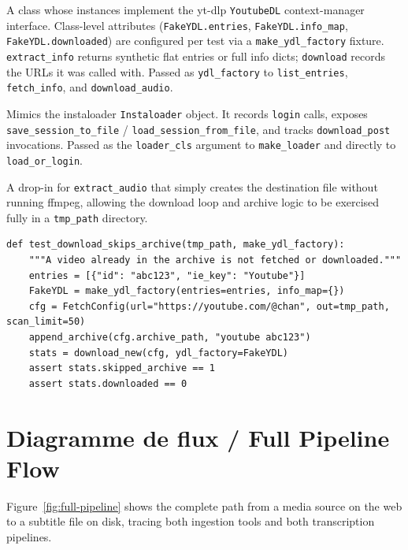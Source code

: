 \documentclass[11pt,a4paper]{report}
\newcommand{\code}[1]{\texttt{\small #1}}
\begin{document}
\begin{description}[leftmargin=2em,style=nextline]
  \item[\code{FakeYDL}] A class whose instances implement the yt-dlp
        \code{YoutubeDL} context-manager interface.  Class-level attributes
        (\code{FakeYDL.entries}, \code{FakeYDL.info\_map}, \code{FakeYDL.downloaded})
        are configured per test via a \code{make\_ydl\_factory} fixture.
        \code{extract\_info} returns synthetic flat entries or full info dicts;
        \code{download} records the URLs it was called with.  Passed as
        \code{ydl\_factory} to \code{list\_entries}, \code{fetch\_info}, and
        \code{download\_audio}.
  \item[\code{FakeLoader}] Mimics the instaloader \code{Instaloader} object.
        It records \code{login} calls, exposes \code{save\_session\_to\_file} /
        \code{load\_session\_from\_file}, and tracks \code{download\_post}
        invocations.  Passed as the \code{loader\_cls} argument to
        \code{make\_loader} and directly to \code{load\_or\_login}.
  \item[\code{fake\_extract}] A drop-in for \code{extract\_audio} that simply
        creates the destination file without running ffmpeg, allowing the download
        loop and archive logic to be exercised fully in a \code{tmp\_path}
        directory.
\end{description}

\begin{lstlisting}[caption={Typical injection pattern in the YouTube tests.}]
def test_download_skips_archive(tmp_path, make_ydl_factory):
    """A video already in the archive is not fetched or downloaded."""
    entries = [{"id": "abc123", "ie_key": "Youtube"}]
    FakeYDL = make_ydl_factory(entries=entries, info_map={})
    cfg = FetchConfig(url="https://youtube.com/@chan", out=tmp_path, scan_limit=50)
    append_archive(cfg.archive_path, "youtube abc123")
    stats = download_new(cfg, ydl_factory=FakeYDL)
    assert stats.skipped_archive == 1
    assert stats.downloaded == 0
\end{lstlisting}

\section{Diagramme de flux / Full Pipeline Flow}

Figure~\ref{fig:full-pipeline} shows the complete path from a media source on
the web to a subtitle file on disk, tracing both ingestion tools and both
transcription pipelines.
\end{document}
